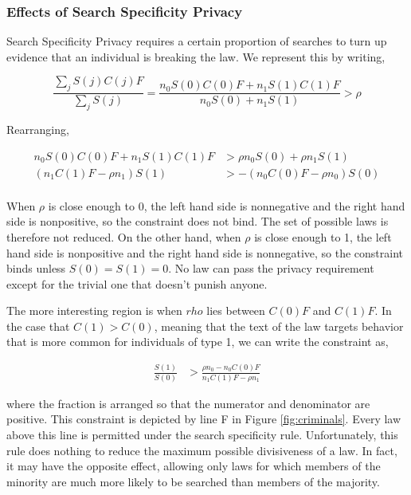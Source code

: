 \subsubsection{Effects of Search Specificity Privacy}

Search Specificity Privacy requires a certain proportion of searches to turn up evidence that an individual is breaking the law.  We represent this by writing,

$$\frac{\sum_j S(j)C(j)F}{\sum_j S(j)} = \frac{ n_0 S(0)C(0)F + n_1 S(1)C(1)F}{n_0 S(0) + n_1 S(1)}  > \rho$$

Rearranging,

\begin{align}
\nonumber n_0 S(0)C(0)F + n_1 S(1)C(1)F &> \rho n_0 S(0) + \rho n_1 S(1) \\
\nonumber  (n_1 C(1)F - \rho n_1 ) S(1) &>  - (n_0 C(0)F - \rho n_0 )S(0) \\
\end{align}

When $\rho$ is close enough to 0, the left hand side is nonnegative and the right hand side is nonpositive, so the constraint does not bind.  The set of possible laws is therefore not reduced.  On the other hand, when $\rho$ is close enough to 1, the left hand side is nonpositive and the right hand side is nonnegative, so the constraint binds unless $S(0) = S(1) = 0$.  No law can pass the privacy requirement except for the trivial one that doesn't punish anyone.  

The more interesting region is when $rho$ lies between  $C(0)F$ and $C(1)F$.  In the case that $C(1) > C(0)$, meaning that the text of the law targets behavior that is more common for individuals of type 1, we can write the constraint as,

\begin{align}
\frac{S(1)}{S(0)} &>  \frac{\rho n_0 - n_0 C(0)F }{n_1 C(1)F - \rho n_1}
\end{align}

where the fraction is arranged so that the numerator and denominator are positive.  This constraint is depicted by line F in Figure \ref{fig:criminals}.  Every law above this line is permitted under the search specificity rule.  Unfortunately, this rule does nothing to reduce the maximum possible divisiveness of a law.  In fact, it may have the opposite effect, allowing only laws for which members of the minority are much more likely to be searched than members of the majority.

